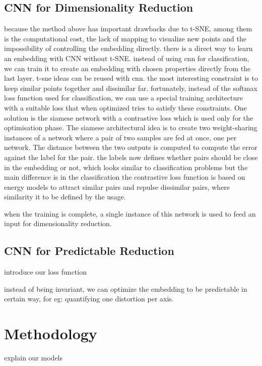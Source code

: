 \documentclass[a4paper,12pt]{report}
\begin{document}
\section{CNN for Dimensionality Reduction}
because the method above has important drawbacks due to t-SNE, among them is the computational cost, the lack of mapping to visualize new points and the impossibility of controlling the embedding directly.
there is a direct way to learn an embedding with CNN without t-SNE.
instead of using cnn for classification, we can train it to create an embedding with chosen properties directly from the last layer.
t-sne ideas can be reused with cnn.
the most interesting constraint is to keep similar points together and dissimilar far.
fortunately, instead of the softmax loss function used for classification, we can use a special training architecture with a suitable loss that when optimized tries to satisfy these constraints.
One solution is the siamese network with a contrastive loss which is used only for the optimisation phase.
The siamese architectural idea is to create two weight-sharing instances of a network where a pair of two samples are fed at once, one per network.
The distance between the two outputs is computed to compute the error against the label for the pair.
the labels now defines whether pairs should be close in the embedding or not, which looks similar to classification problems but the main difference is in the classification
the contrastive loss function is based on energy models to attract similar pairs and repulse dissimilar pairs, where similarity it to be defined by the usage.

when the training is complete, a single instance of this network is used to feed an input for dimensionality reduction.

\section{CNN for Predictable Reduction}
introduce our loss function

instead of being invariant, we can optimize the embedding to be predictable in certain way, for eg: quantifying one distortion per axis.


\chapter{Methodology}

explain our models
\end{document}
